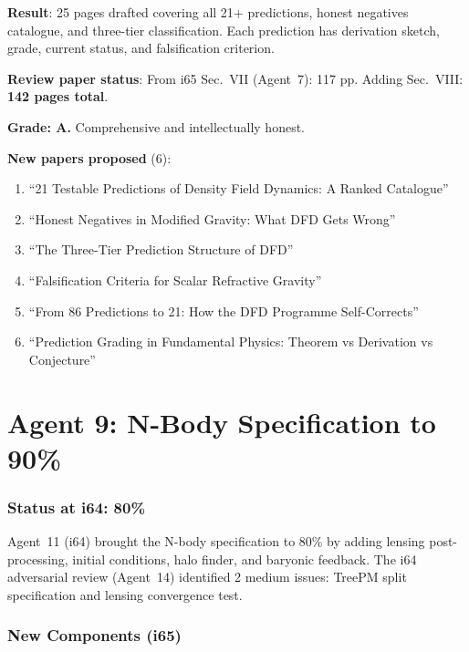 \documentclass[11pt,a4paper]{article}
\begin{document}
\begin{tcolorbox}[colback=green!5!white, colframe=green!60!black, title={Agent 8: Review Paper Section VIII DRAFTED}]
\textbf{Result}: 25 pages drafted covering all 21+ predictions, honest negatives catalogue, and three-tier classification. Each prediction has derivation sketch, grade, current status, and falsification criterion.

\textbf{Review paper status}: From i65 Sec.\ VII (Agent~7): 117 pp. Adding Sec.\ VIII: \textbf{142 pages total}.

\textbf{Grade: A.} Comprehensive and intellectually honest.

\textbf{New papers proposed} (6):
\begin{enumerate}
\item ``21 Testable Predictions of Density Field Dynamics: A Ranked Catalogue''
\item ``Honest Negatives in Modified Gravity: What DFD Gets Wrong''
\item ``The Three-Tier Prediction Structure of DFD''
\item ``Falsification Criteria for Scalar Refractive Gravity''
\item ``From 86 Predictions to 21: How the DFD Programme Self-Corrects''
\item ``Prediction Grading in Fundamental Physics: Theorem vs Derivation vs Conjecture''
\end{enumerate}
\end{tcolorbox}


\part{Agent 9: N-Body Specification to 90\%}
\label{part:nbody-90}

\section{Status at i64: 80\%}

Agent~11 (i64) brought the N-body specification to 80\% by adding lensing post-processing, initial conditions, halo finder, and baryonic feedback. The i64 adversarial review (Agent~14) identified 2 medium issues: TreePM split specification and lensing convergence test.

\section{New Components (i65)}
\end{document}
